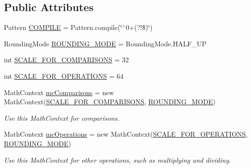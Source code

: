\subsection*{Public Attributes}
\begin{DoxyCompactItemize}
\item 
Pattern \hyperlink{interfacecom_1_1aarrelaakso_1_1drawl_1_1_number_ad6cff21beec53c9eb5d47ee035e67aa7}{C\+O\+M\+P\+I\+LE} = Pattern.\+compile(\char`\"{}$^\wedge$0+(?!\$)\char`\"{})
\item 
Rounding\+Mode \hyperlink{interfacecom_1_1aarrelaakso_1_1drawl_1_1_number_a98fc7994c62ec7d9a44b11ba2a5b1b02}{R\+O\+U\+N\+D\+I\+N\+G\+\_\+\+M\+O\+DE} = Rounding\+Mode.\+H\+A\+L\+F\+\_\+\+UP
\item 
int \hyperlink{interfacecom_1_1aarrelaakso_1_1drawl_1_1_number_a026ad95b5d9df801218f36987bc1982e}{S\+C\+A\+L\+E\+\_\+\+F\+O\+R\+\_\+\+C\+O\+M\+P\+A\+R\+I\+S\+O\+NS} = 32
\item 
int \hyperlink{interfacecom_1_1aarrelaakso_1_1drawl_1_1_number_afdeba9a614751537318fdb3500ffea79}{S\+C\+A\+L\+E\+\_\+\+F\+O\+R\+\_\+\+O\+P\+E\+R\+A\+T\+I\+O\+NS} = 64
\item 
Math\+Context \hyperlink{interfacecom_1_1aarrelaakso_1_1drawl_1_1_number_ad58946b10553ff37f8b02913de34b664}{mc\+Comparisons} = new Math\+Context(\hyperlink{interfacecom_1_1aarrelaakso_1_1drawl_1_1_number_a026ad95b5d9df801218f36987bc1982e}{S\+C\+A\+L\+E\+\_\+\+F\+O\+R\+\_\+\+C\+O\+M\+P\+A\+R\+I\+S\+O\+NS}, \hyperlink{interfacecom_1_1aarrelaakso_1_1drawl_1_1_number_a98fc7994c62ec7d9a44b11ba2a5b1b02}{R\+O\+U\+N\+D\+I\+N\+G\+\_\+\+M\+O\+DE})
\begin{DoxyCompactList}\small\item\em Use this Math\+Context for comparisons. \end{DoxyCompactList}\item 
Math\+Context \hyperlink{interfacecom_1_1aarrelaakso_1_1drawl_1_1_number_aee829b12bd1d3dc81ecf7bdf4207f778}{mc\+Operations} = new Math\+Context(\hyperlink{interfacecom_1_1aarrelaakso_1_1drawl_1_1_number_afdeba9a614751537318fdb3500ffea79}{S\+C\+A\+L\+E\+\_\+\+F\+O\+R\+\_\+\+O\+P\+E\+R\+A\+T\+I\+O\+NS}, \hyperlink{interfacecom_1_1aarrelaakso_1_1drawl_1_1_number_a98fc7994c62ec7d9a44b11ba2a5b1b02}{R\+O\+U\+N\+D\+I\+N\+G\+\_\+\+M\+O\+DE})
\begin{DoxyCompactList}\small\item\em Use this Math\+Context for other operations, such as multiplying and dividing. \end{DoxyCompactList}\end{DoxyCompactItemize}


